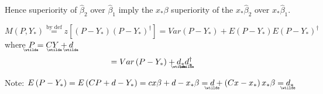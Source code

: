 \documentclass{article}
\begin{document}
\bigskip 

Hence superiority of $\hat{\beta}_{2}$ over $\hat{\beta}_{1}$ imply the $%
x_{\ast }\beta $ superiority of the $x_{\ast }\hat{\beta}_{2}$ over $x_{\ast
}\hat{\beta}_{1}$.

\begin{equation*}
M\left( P,Y_{\ast }\right) \overset{\text{by def}}{=}z\left[ \left(
P-Y_{\ast }\right) \left( P-Y_{\ast }\right) ^{\dagger }\right] =Var\left(
P-Y_{\ast }\right) +E\left( P-Y_{\ast }\right) E\left( P-Y_{\ast }\right)
^{\dagger }
\end{equation*}%
where $%
\underaccent{\wtilde}{P}%
=C%
\underaccent{\wtilde}{Y}%
+%
\underaccent{\wtilde}{d}%
$%
\begin{equation*}
=Var\left( P-Y_{\ast }\right) +%
\underaccent{\wtilde}{d}%
_{\ast }%
\underaccent{\wtilde}{d}%
_{\ast }^{\dagger }
\end{equation*}

Note: $E\left( P-Y_{\ast }\right) =E\left( CP+d-Y_{\ast }\right) =cx\beta
+d-x_{\ast }\beta =%
\underaccent{\wtilde}{d}%
+\left( Cx-x_{\ast }\right) x_{\ast }\beta =%
\underaccent{\wtilde}{d}%
_{\ast }$
\end{document}
